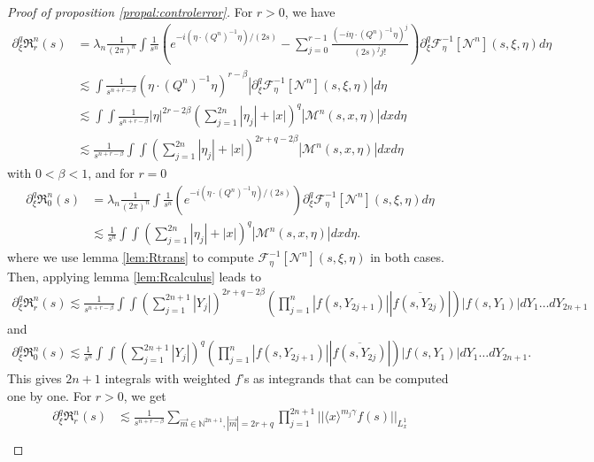 \documentclass[10pt,a4paper]{amsart}
\begin{document}
\begin{proof}[Proof of proposition \ref{propal:controlerror}]
For $r>0$, we have
\begin{align*}
    \partial^q_\xi \mathfrak{R}^n_r(s)&=\lambda_n\frac{1}{(2\pi)^n}\int\frac{1}{s^n}(e^{-i(\eta\cdot  (Q^n)^{-1}\eta)/(2s)}-\sum^{r-1}_{j=0}\frac{(-i\eta\cdot (Q^n)^{-1}\eta)^j}{(2s)^{j}j!}) \partial^q_\xi\mathcal{F}^{-1}_{\eta}[\mathcal{N}^n](s,\xi,\eta)d\eta\\
    &\lesssim \int\frac{1}{s^{n+r-\beta}}(\eta\cdot (Q^n)^{-1}\eta)^{r-\beta} |\partial^q_\xi\mathcal{F}^{-1}_{\eta}[\mathcal{N}^n](s,\xi,\eta)|d\eta\\
    &\lesssim\int\int\frac{1}{s^{n+r-\beta}}|\eta|^{2r-2\beta} (\sum_{j=1}^{2n}|\eta_j|+|x|)^{q}|\mathcal{M}^{n}(s,x,\eta)|dxd\eta\\
    &\lesssim\frac{1}{s^{n+r-\beta}}\int\int(\sum_{j=1}^{2n}|\eta_j|+|x|)^{2r+q-2\beta} |\mathcal{M}^{n}(s,x,\eta)|dxd\eta
\end{align*}
with $0<\beta<1$, and for $r=0$
\begin{align*}
    \partial^q_\xi \mathfrak{R}^n_0(s)&=\lambda_n\frac{1}{(2\pi)^n}\int\frac{1}{s^n}(e^{-i(\eta\cdot  (Q^n)^{-1}\eta)/(2s)}) \partial^q_\xi\mathcal{F}^{-1}_{\eta}[\mathcal{N}^n](s,\xi,\eta)d\eta\\
    &\lesssim \frac{1}{s^{n}} \int\int(\sum_{j=1}^{2n}|\eta_j|+|x|)^{q}|\mathcal{M}^{n}(s,x,\eta)|dxd\eta.
\end{align*} 
where we use lemma \ref{lem:Rtrans} to compute $\mathcal{F}^{-1}_{\eta}[\mathcal{N}^n](s,\xi,\eta)$ in both cases. Then, applying lemma \ref{lem:Rcalculus} leads to
\begin{align*}
    \partial^q_\xi \mathfrak{R}^n_r(s)\lesssim\frac{1}{s^{n+r-\beta}}\int\int(\sum_{j=1}^{2n+1}|Y_{j}|)^{2r+q-2\beta}\left(\prod^{n}_{j=1}|f(s,Y_{2j+1})||\overline{f(s,Y_{2j})}|\right)|f(s,Y_1)|dY_1\dots dY_{2n+1}
\end{align*}
and 
\begin{align*}
    \partial^q_\xi \mathfrak{R}^n_0(s)\lesssim\frac{1}{s^{n}} \int\int(\sum_{j=1}^{2n+1}|Y_{j}|)^{q}\left(\prod^{n}_{j=1}|f(s,Y_{2j+1})||\overline{f(s,Y_{2j})}|\right)|f(s,Y_1)|dY_1\dots dY_{2n+1}.
\end{align*}
This gives $2n+1$ integrals with weighted $f$'s as integrands that can be computed one by one. For $r>0$, we get 
\begin{align*}
    \partial^q_\xi \mathfrak{R}^n_r(s)
    &\lesssim \frac{1}{s^{n+r-\beta}}\sum_{\overrightarrow{m}\in\mathbb{N}^{2n+1}, |\overrightarrow{m}|=2r+q}\prod^{2n+1}_{j=1}||\langle x\rangle^{m_j\gamma} f(s)||_{L^1_x} \\

\end{align*}
\end{proof}
\end{document}
